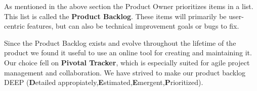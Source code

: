 As mentioned in the above section the Product Owner prioritizes items in a list. This list is called the \textbf{Product Backlog}. These items will primarily be user-centric features, but can also be technical improvement goals or bugs to fix.

Since the Product Backlog exists and evolve throughout the lifetime of the product we found it useful to use an online tool for creating and maintaining it. Our choice fell on \textbf{Pivotal Tracker}, which is especially suited for agile project management and collaboration. We have strived to make our product backlog DEEP (\textbf{D}etailed appropiately,\textbf{E}stimated,\textbf{E}mergent,\textbf{P}rioritized).
